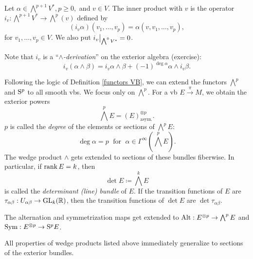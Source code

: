 \begin{defn}
    Let $\alpha\in\bigwedge^{p+1}V^\ast, p\geq 0,$ and $v\in V$. The inner product with $v$ is the operator $i_v:\bigwedge^{p+1}V^\ast\to \bigwedge^p(v)$ defined by 
    \[(i_v \alpha)(v_1,\ldots,v_p)=\alpha(v,v_1,\ldots,v_p),\]
    for $v_1,\ldots,v_p\in V$. We also put $\restr{i_v}{\bigwedge^0V^\ast}=0$.
\end{defn}

Note that $i_v$ is a ``\emph{$\wedge$-derivation}'' on the exterior algebra (exercise):
\[i_v(\alpha\wedge\beta)=i_v\alpha\wedge\beta+(-1)^{\deg \alpha}\alpha\wedge i_v\beta.\label{eq inner product derivation}\]

\begin{defn}
Following the logic of Definition \ref{functors VB}, we can extend the functors $\bigwedge^p$ and $\mathrm{S}^p$ to all smooth \glspl{vb}. We focus only on $\bigwedge^p$. For a \gls{vb} $E\overset{\pi}{\to} M$, we obtain the exterior powers
\[\bigwedge^p E=(E)^{\otimes p}_{\text{asym.}}.\]
$p$ is called the \emph{degree} of the elements or sections of $\bigwedge^p E$: \[\deg \alpha=p\;\text{ for }\;\alpha\in\Gamma^\infty\left(\bigwedge^p E\right).\]
The wedge product $\wedge$ gets extended to sections of these bundles fiberwise.
In particular, if $\operatorname{rank} E=k$, then \[\det E\coloneqq \bigwedge^k E\] is called the \emph{determinant (line) bundle} of $E$. If the transition functions of $E$ are $\tau_{\alpha\beta}:U_{\alpha\beta}\to \operatorname{GL}_k(\mathbb{R} )$, then the transition functions of $\det E$ are $\det \tau_{\alpha\beta}$.

The alternation and symmetrization maps get extended to $\operatorname{Alt}: E^{\otimes p}\to \bigwedge^p E$ and $\operatorname{Sym}: E^{\otimes p}\to \mathrm{S}^p E$.
\end{defn}

All properties of wedge products listed above immediately generalize to sections of the exterior bundles.

